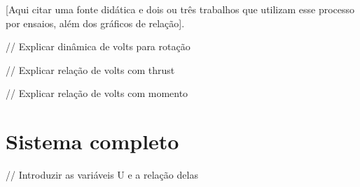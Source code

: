 \documentclass[main.tex]{subfiles}
\begin{document}
[Aqui citar uma fonte didática e dois ou três trabalhos que utilizam esse processo por ensaios, além dos gráficos de relação].


\textcolor{anotacao}{// Explicar dinâmica de volts para rotação}

\textcolor{anotacao}{// Explicar relação de volts com thrust}

\textcolor{anotacao}{// Explicar relação de volts com momento}


\section{Sistema completo}

\textcolor{anotacao}{// Introduzir as variáveis U e a relação delas}





\end{document}
